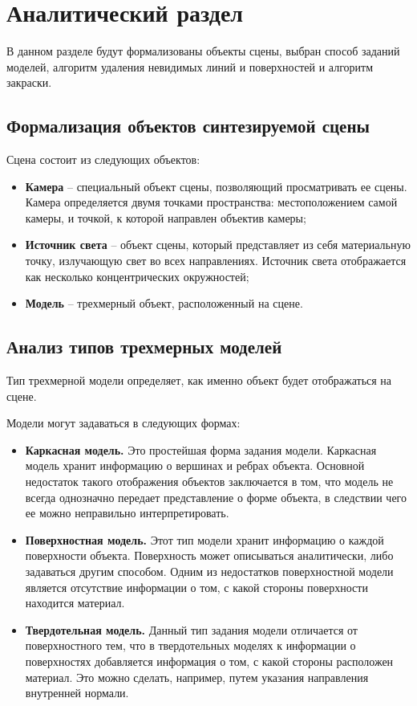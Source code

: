 \chapter{Аналитический раздел}

В данном разделе будут формализованы объекты сцены, выбран способ заданий моделей, алгоритм удаления невидимых линий и поверхностей и алгоритм закраски.

\section{Формализация объектов синтезируемой сцены}

Сцена состоит из следующих объектов:
\begin{itemize}[label=---]
	\item \textbf{Камера} -- специальный объект сцены, позволяющий просматривать ее сцены. Камера определяется двумя точками пространства: местоположением самой камеры, и точкой, к которой направлен объектив камеры;
	
	\item \textbf{Источник света} -- объект сцены, который представляет из себя материальную точку, излучающую свет во всех направлениях. Источник света отображается как несколько концентрических окружностей;
	
	\item \textbf{Модель} -- трехмерный объект, расположенный на сцене.
\end{itemize}

\section{Анализ типов трехмерных моделей}

Тип трехмерной модели определяет, как именно объект будет отображаться на сцене.

Модели могут задаваться в следующих формах:

\begin{itemize}[label=---]
	\item \textbf{Каркасная модель.} Это простейшая форма задания модели. Каркасная модель хранит информацию о вершинах и ребрах объекта. Основной недостаток такого отображения объектов заключается в том, что модель не всегда однозначно передает представление о форме объекта, в следствии чего ее можно неправильно интерпретировать.
	\item \textbf{Поверхностная модель.} Этот тип модели хранит информацию о каждой поверхности объекта. Поверхность может описываться аналитически, либо задаваться другим способом. Одним из недостатков поверхностной модели является отсутствие информации о том, с какой стороны поверхности находится материал.
	\item \textbf{Твердотельная модель.} Данный тип задания модели отличается от поверхностного тем, что в твердотельных моделях к информации о поверхностях добавляется информация о том, с какой стороны расположен материал. Это можно сделать, например, путем указания направления внутренней нормали. 
\end{itemize}

